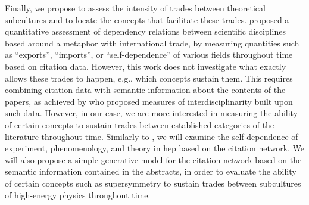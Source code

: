 \documentclass[smallextended]{svjour3}
\begin{document}
Finally, we propose to assess the intensity of trades between theoretical subcultures and to locate the concepts that facilitate these trades.  \citet{Yan2013} proposed a quantitative assessment of dependency relations between scientific disciplines based around a metaphor with international trade, by measuring quantities such as ``exports'', ``imports'', or ``self-dependence'' of various fields throughout time based on citation data. However, this work does not investigate what exactly allows these trades to happen, e.g., which concepts sustain them. This requires combining citation data with semantic information about the contents of the papers, as achieved by \citet{Raimbault2019} who proposed measures of interdisciplinarity built upon such data. However, in our case, we are more interested in measuring the ability of certain concepts to sustain trades between established categories of the literature throughout time. Similarly to \citealt{Yan2013}, we will examine the self-dependence of experiment, phenomenology, and theory in \gls{hep} based on the citation network. We will also propose a simple generative model for the citation network based on the semantic information contained in the abstracts, in order to evaluate the ability of certain concepts such as supersymmetry to sustain trades between subcultures of high-energy physics throughout time.




\end{document}
